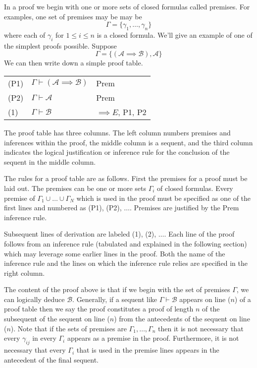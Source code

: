 \documentclass[12pt]{article}
\theoremstyle{break}
\theoremstyle{break}
\theoremstyle{break}
\theoremstyle{break}
\newcommand{\mc}[1]{\mathcal{#1}}
\begin{document}
In a proof we begin with one or more sets of closed formulas called premises.
For examples, one set of premises may be may be
$$
\Gamma = \{\gamma_1, \ldots, \gamma_n\}
$$
where each of $\gamma_i$ for $1\le i \le n$ is a closed formula.
We'll give an example of one of the simplest proofs possible.
Suppose 
$$
\Gamma = \{(\mc{A}\implies \mc{B}), \mc{A}\}
$$
We can then write down a simple proof table.
\begin{center}
\begin{tabular}{ p{1cm} p{6cm} p{3cm} }
(P1) & $\Gamma \vdash (\mc{A} \implies \mc{B})$ & Prem\\
(P2) & $\Gamma \vdash \mc{A}$ & Prem\\
(1) & $\Gamma \vdash \mc{B}$ & $\implies E$, P1, P2
\end{tabular}
\end{center}

The proof table has three columns.
The left column numbers premises and inferences within the proof, the middle column is a sequent, and the third column indicates the logical justification or inference rule for the conclusion of the sequent in the middle column.

The rules for a proof table are as follows. 
First the premises for a proof must be laid out.
The premises can be one or more sets $\Gamma_i$ of closed formulas. 
Every premise of $\Gamma_1 \cup \ldots \cup \Gamma_N$ which is used in the proof must be specified as one of the first lines and numbered as (P1), (P2), $\ldots$.
Premises are justified by the Prem inference rule.

Subsequent lines of derivation are labeled (1), (2), $\ldots$.
Each line of the proof follows from an inference rule (tabulated and explained in the following section) which may leverage some earlier lines in the proof.
Both the name of the inference rule and the lines on which the inference rule relies are specified in the right column.

The content of the proof above is that if we begin with the set of premises $\Gamma$, we can logically deduce $\mc{B}$.
Generally, if a sequent like $\Gamma \vdash \mc{B}$ appears on line ($n$) of a proof table then we say the proof constitutes a proof of length $n$ of the subsequent of the sequent on line ($n$) from the antecedents of the sequent on line ($n$).
Note that if the sets of premises are $\Gamma_1, \ldots, \Gamma_n$ then it is not necessary that every $\gamma_{ij}$ in every $\Gamma_i$ appears as a premise in the proof.
Furthermore, it is not necessary that every $\Gamma_i$ that is used in the premise lines appears in the antecedent of the final sequent.
\end{document}
